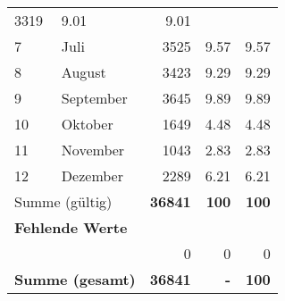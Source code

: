 \begin{longtable}{lXrrr}
       \num{3319} &
       \num[round-mode=places,round-precision=2]{9.01} &
         \num[round-mode=places,round-precision=2]{9.01} \\

     7 &
     \multicolumn{1}{X}{ Juli   } &


       \num{3525} &
       \num[round-mode=places,round-precision=2]{9.57} &
         \num[round-mode=places,round-precision=2]{9.57} \\

     8 &
     \multicolumn{1}{X}{ August   } &


       \num{3423} &
       \num[round-mode=places,round-precision=2]{9.29} &
         \num[round-mode=places,round-precision=2]{9.29} \\

     9 &
     \multicolumn{1}{X}{ September   } &


       \num{3645} &
       \num[round-mode=places,round-precision=2]{9.89} &
         \num[round-mode=places,round-precision=2]{9.89} \\

     10 &
     \multicolumn{1}{X}{ Oktober   } &


       \num{1649} &
       \num[round-mode=places,round-precision=2]{4.48} &
         \num[round-mode=places,round-precision=2]{4.48} \\

     11 &
     \multicolumn{1}{X}{ November   } &


       \num{1043} &
       \num[round-mode=places,round-precision=2]{2.83} &
         \num[round-mode=places,round-precision=2]{2.83} \\

     12 &
     \multicolumn{1}{X}{ Dezember   } &


       \num{2289} &
       \num[round-mode=places,round-precision=2]{6.21} &
         \num[round-mode=places,round-precision=2]{6.21} \\
     \midrule
     \multicolumn{2}{l}{Summe (gültig)} &
       \textbf{\num{36841}} &
     \textbf{\num{100}} &
       \textbf{\num[round-mode=places,round-precision=2]{100}} \\
     \multicolumn{5}{l}{\textbf{Fehlende Werte}}\\
      & & 0 & 0 & 0 \\
     \midrule
     \multicolumn{2}{l}{\textbf{Summe (gesamt)}} &
          \textbf{\num{36841}} &
        \textbf{-} &
        \textbf{\num{100}} \\
     \bottomrule
     \end{longtable}
     
